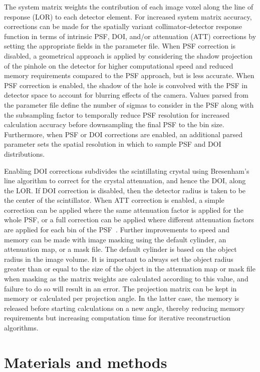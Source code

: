 \documentclass[utf8]{FrontiersinHarvard} %
\begin{document}
The system matrix weights the contribution of each image voxel along the line of response (LOR) to each detector element. For increased system matrix accuracy, corrections can be made for the spatially variant collimator-detector response function in terms of intrinsic PSF, DOI, and/or attenuation (ATT) corrections by setting the appropriate fields in the parameter file. When PSF correction is disabled, a geometrical approach is applied by considering the shadow projection of the pinhole on the detector for higher computational speed and reduced memory requirements compared to the PSF approach, but is less accurate. When PSF correction is enabled, the shadow of the hole is convolved with the PSF in detector space to account for blurring effects of the camera. Values parsed from the parameter file define the number of sigmas to consider in the PSF along with the subsampling factor to temporally reduce PSF resolution for increased calculation accuracy before downsampling the final PSF to the bin size. Furthermore, when PSF or DOI corrections are enabled, an additional parsed parameter sets the spatial resolution in which to sample PSF and DOI distributions. 

Enabling DOI corrections subdivides the scintillating crystal using Bresenham's line algorithm to correct for the crystal attenuation, and hence the DOI, along the LOR. If DOI correction is disabled, then the detector radius is taken to be the center of the scintillator. When ATT correction is enabled, a simple correction can be applied where the same attenuation factor is applied for the whole PSF, or a full correction can be applied where different attenuation factors are applied for each bin of the PSF~\cite{fuster_2014}. Further improvements to speed and memory can be made with image masking using the default cylinder, an attenuation map, or a mask file. The default cylinder is based on the object radius in the image volume. It is important to always set the object radius greater than or equal to the size of the object in the attenuation map or mask file when masking as the matrix weights are calculated according to this value, and failure to do so will result in an error. The projection matrix can be kept in memory or calculated per projection angle. In the latter case, the memory is released before starting calculations on a new angle, thereby reducing memory requirements but increasing computation time for iterative reconstruction algorithms.

\section{Materials and methods}
\end{document}
